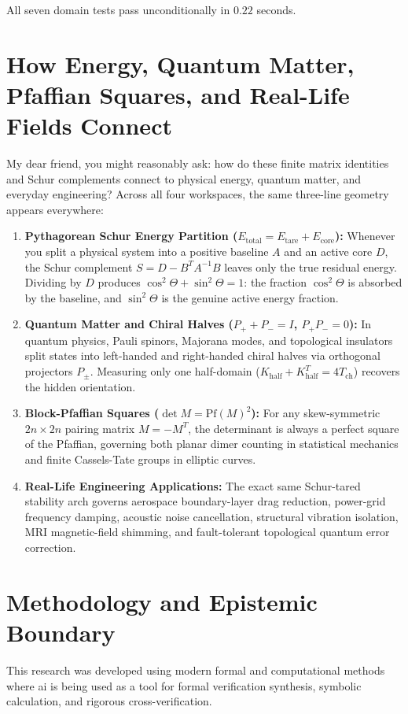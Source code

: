 \documentclass[11pt,a4paper]{article}
\theoremstyle{definition}
\begin{document}
All seven domain tests pass unconditionally in $0.22$ seconds.


\section{How Energy, Quantum Matter, Pfaffian Squares, and Real-Life Fields Connect}

My dear friend, you might reasonably ask: how do these finite matrix identities and Schur complements connect to physical energy, quantum matter, and everyday engineering? Across all four workspaces, the same three-line geometry appears everywhere:

\begin{enumerate}
  \item \textbf{Pythagorean Schur Energy Partition ($E_{\mathrm{total}} = E_{\mathrm{tare}} + E_{\mathrm{core}}$):} Whenever you split a physical system into a positive baseline $A$ and an active core $D$, the Schur complement $S = D - B^T A^{-1} B$ leaves only the true residual energy. Dividing by $D$ produces $\cos^2\Theta + \sin^2\Theta = 1$: the fraction $\cos^2\Theta$ is absorbed by the baseline, and $\sin^2\Theta$ is the genuine active energy fraction.
  \item \textbf{Quantum Matter and Chiral Halves ($P_+ + P_- = I$, $P_+ P_- = 0$):} In quantum physics, Pauli spinors, Majorana modes, and topological insulators split states into left-handed and right-handed chiral halves via orthogonal projectors $P_\pm$. Measuring only one half-domain ($K_{\mathrm{half}} + K_{\mathrm{half}}^T = 4 T_{\mathrm{ch}}$) recovers the hidden orientation.
  \item \textbf{Block-Pfaffian Squares ($\det M = \mathrm{Pf}(M)^2$):} For any skew-symmetric $2n \times 2n$ pairing matrix $M = -M^T$, the determinant is always a perfect square of the Pfaffian, governing both planar dimer counting in statistical mechanics and finite Cassels-Tate groups in elliptic curves.
  \item \textbf{Real-Life Engineering Applications:} The exact same Schur-tared stability arch governs aerospace boundary-layer drag reduction, power-grid frequency damping, acoustic noise cancellation, structural vibration isolation, MRI magnetic-field shimming, and fault-tolerant topological quantum error correction.
\end{enumerate}

\section{Methodology and Epistemic Boundary}
\noindent This research was developed using modern formal and computational methods where ai is being used as a tool for formal verification synthesis, symbolic calculation, and rigorous cross-verification.
\end{document}
